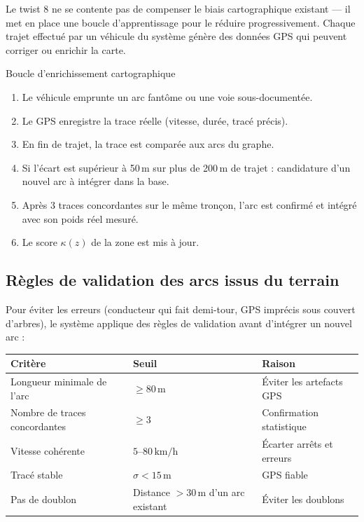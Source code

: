 \documentclass[12pt,a4paper]{article}
\theoremstyle{definition}
\theoremstyle{remark}
\begin{document}
Le twist 8 ne se contente pas de compenser le biais cartographique
existant --- il met en place une boucle d'apprentissage pour le
réduire progressivement. Chaque trajet effectué par un véhicule
du système génère des données GPS qui peuvent corriger ou enrichir
la carte.

\begin{metierbox}{Boucle d'enrichissement cartographique}
\begin{enumerate}[leftmargin=1.5em, itemsep=4pt]
  \item Le véhicule emprunte un arc fantôme ou une voie sous-documentée.
  \item Le GPS enregistre la trace réelle (vitesse, durée, tracé précis).
  \item En fin de trajet, la trace est comparée aux arcs du graphe.
  \item Si l'écart est supérieur à 50\,m sur plus de 200\,m de trajet :
    candidature d'un nouvel arc à intégrer dans la base.
  \item Après 3 traces concordantes sur le même tronçon, l'arc est
    confirmé et intégré avec son poids réel mesuré.
  \item Le score $\kappa(z)$ de la zone est mis à jour.
\end{enumerate}
\end{metierbox}

\subsection{Règles de validation des arcs issus du terrain}

Pour éviter les erreurs (conducteur qui fait demi-tour, GPS imprécis
sous couvert d'arbres), le système applique des règles de validation
avant d'intégrer un nouvel arc :

\begin{center}
\begin{tabular}{lll}
  \toprule
  \textbf{Critère} & \textbf{Seuil} & \textbf{Raison} \\
  \midrule
  Longueur minimale de l'arc    & $\geq 80\,\text{m}$   & Éviter les artefacts GPS \\
  Nombre de traces concordantes & $\geq 3$              & Confirmation statistique \\
  Vitesse cohérente             & $5$--$80\,\text{km/h}$& Écarter arrêts et erreurs \\
  Tracé stable                  & $\sigma < 15\,\text{m}$& GPS fiable \\
  Pas de doublon                & Distance $> 30\,\text{m}$ d'un arc existant & Éviter les doublons \\
  \bottomrule
\end{tabular}
\end{center}
\end{document}

